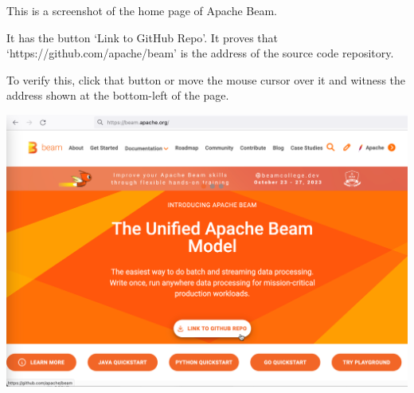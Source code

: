 
This is a screenshot of the home page of Apache Beam.

It has the button `Link to GitHub Repo'.
It proves that `https://github.com/apache/beam' is the address of the source code repository.

To verify this, click that button or move the mouse cursor over it
and witness the address shown at the bottom-left of the page.

\includegraphics[width=\textwidth]{beam-home}

\pagebreak
